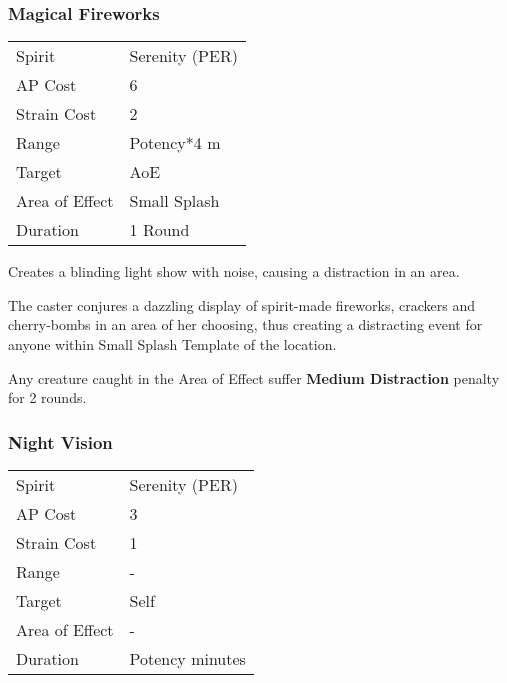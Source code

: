 \documentclass[11pt,a4paper,twocolumn]{book}
\begin{document}
\subsubsection*{Magical Fireworks}
{
	\begin{tabu} to 75mm{| X[l,4] | X[l,7] |}
		\hline
		Spirit 			& Serenity (PER) 		\\
		AP Cost	      	& 6 					\\
		Strain Cost     & 2 					\\
		Range     		& Potency*4	m			\\
		Target      	& AoE					\\
		Area of Effect  & Small Splash  	 		\\
		Duration     	& 1 Round				\\ \hline
	\end{tabu}
	
}

\medskip

Creates a blinding light show with noise, causing a distraction in an area.

The caster conjures a dazzling display of spirit-made fireworks, crackers and cherry-bombs in an area of her choosing, thus creating a distracting event for anyone within Small Splash Template of the location.

Any creature caught in the Area of Effect suffer \textbf{Medium Distraction} penalty for 2 rounds.







\subsubsection*{Night Vision}
{
	\begin{tabu} to 70mm{| X[l,4] | X[l,7] |}
		\hline
		Spirit         & Serenity (PER)  \\
		AP Cost        & 3               \\
		Strain Cost    & 1               \\
		Range          & -               \\
		Target         & Self            \\
		Area of Effect & -               \\
		Duration       & Potency minutes \\ \hline
	\end{tabu}
	
}
\end{document}
